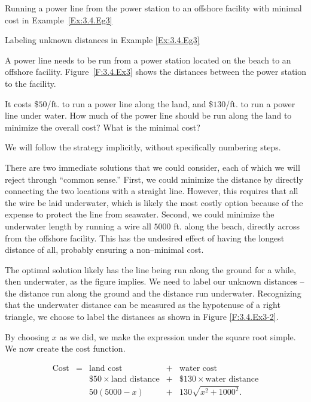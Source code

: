 \begin{marginfigure}[4cm]
\caption{Running a power line from the power station to an offshore facility with minimal cost in Example~\ref{Ex:3.4.Eg3} } \label{F:3.4.Ex3}
\end{marginfigure}

\begin{marginfigure}[4cm]
\caption{Labeling unknown distances in Example \ref{Ex:3.4.Eg3} } \label{F:3.4.Ex3-2}
\end{marginfigure}

\begin{example} \label{Ex:3.4.Eg3}
A power line needs to be run from a power station located on the beach to an offshore facility. Figure~\ref{F:3.4.Ex3} shows the distances between the power station to the facility.

It costs \$$50$/ft. to run a power line along the land, and \$$130$/ft. to run a power line under water. How much of the power line should be run along the land to minimize the overall cost? What is the minimal cost?

\solution
We will follow the strategy implicitly, without specifically numbering steps.

There are two immediate solutions that we could consider, each of which we will reject through ``common sense.'' First, we could minimize the distance by directly connecting the two locations with a straight line. However, this requires that all the wire be laid underwater, which is likely the most costly option because of the expense to protect the line from seawater. Second, we could minimize the underwater length by running a wire all $5000$ ft. along the beach, directly across from the offshore facility. This has the undesired effect of having the longest distance of all, probably ensuring a non--minimal cost.

The optimal solution likely has the line being run along the ground for a while, then underwater, as the figure implies. We need to label our unknown distances -- the distance run along the ground and the distance run underwater. Recognizing that the underwater distance can be measured as the hypotenuse of a right triangle, we choose to label the distances as shown in Figure \ref{F:3.4.Ex3-2}.

By choosing $x$ as we did, we make the expression under the square root simple. We now create the cost function. 

$$
\begin{array}{ccccc}
\text{Cost} &=&  \text{land cost} &+ & \text{water cost} \\
&	& \text{\$$50$}\times \text{land distance} &+& \text{\$$130$}\times \text{water distance} \\
&	& 50(5000-x) &+& 130\sqrt{x^2+1000^2}.\\
\end{array}
$$


\end{example}
